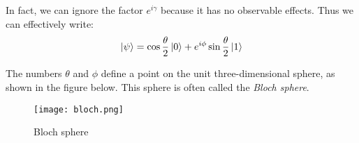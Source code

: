 In fact, we can ignore the factor $e^{i\gamma}$ because it has no observable effects. Thus we can effectively write:
    $$\ket{\psi} = \cos{\frac{\theta}{2}}\ket{0} + e^{i\phi}\sin{\frac{\theta}{2}}\ket{1}$$

The numbers $\theta$ and $\phi$ define a point on the unit three-dimensional sphere, as shown in the figure below. This sphere is often called the \textit{Bloch sphere}.
\begin{figure}[h]
    \centering
    \texttt{[image: bloch.png]}
    \caption{Bloch sphere}
\end{figure}
